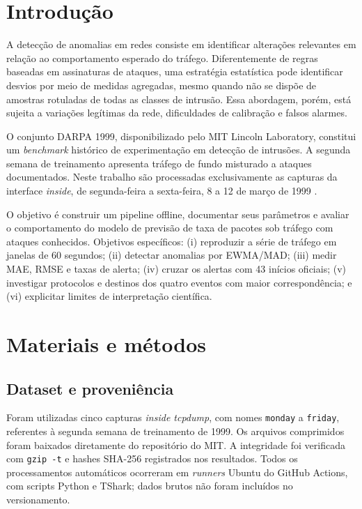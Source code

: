 \documentclass[12pt,oneside,a4paper,brazil]{abntex2}
\begin{document}
\chapter{Introdução}
A detecção de anomalias em redes consiste em identificar alterações relevantes em relação ao comportamento esperado do tráfego. Diferentemente de regras baseadas em assinaturas de ataques, uma estratégia estatística pode identificar desvios por meio de medidas agregadas, mesmo quando não se dispõe de amostras rotuladas de todas as classes de intrusão. Essa abordagem, porém, está sujeita a variações legítimas da rede, dificuldades de calibração e falsos alarmes.

O conjunto DARPA 1999, disponibilizado pelo MIT Lincoln Laboratory, constitui um \textit{benchmark} histórico de experimentação em detecção de intrusões. A segunda semana de treinamento apresenta tráfego de fundo misturado a ataques documentados. Neste trabalho são processadas exclusivamente as capturas da interface \textit{inside}, de segunda-feira a sexta-feira, 8 a 12 de março de 1999 \cite{mitdados,mitataques}.

O objetivo é construir um pipeline offline, documentar seus parâmetros e avaliar o comportamento do modelo de previsão de taxa de pacotes sob tráfego com ataques conhecidos. Objetivos específicos: (i) reproduzir a série de tráfego em janelas de 60 segundos; (ii) detectar anomalias por EWMA/MAD; (iii) medir MAE, RMSE e taxas de alerta; (iv) cruzar os alertas com 43 inícios oficiais; (v) investigar protocolos e destinos dos quatro eventos com maior correspondência; e (vi) explicitar limites de interpretação científica.

\chapter{Materiais e métodos}
\section{Dataset e proveniência}
Foram utilizadas cinco capturas \textit{inside tcpdump}, com nomes \texttt{monday} a \texttt{friday}, referentes à segunda semana de treinamento de 1999. Os arquivos comprimidos foram baixados diretamente do repositório do MIT. A integridade foi verificada com \texttt{gzip -t} e hashes SHA-256 registrados nos resultados. Todos os processamentos automáticos ocorreram em \textit{runners} Ubuntu do GitHub Actions, com scripts Python e TShark; dados brutos não foram incluídos no versionamento.
\end{document}
